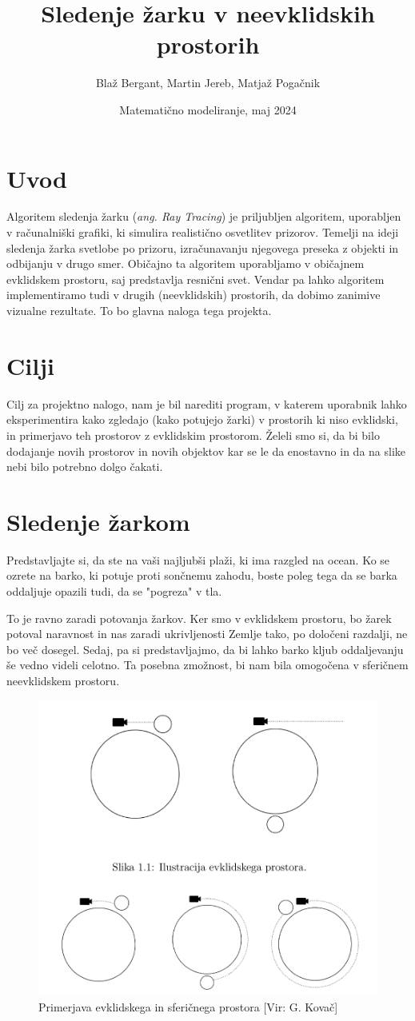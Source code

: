 \documentclass[titlepage]{article}
\title{Sledenje žarku v neevklidskih prostorih}
\author{Blaž Bergant, Martin Jereb, Matjaž Pogačnik}
\date{Matematično modeliranje, maj 2024}
\begin{document}
\maketitle
\newpage
\tableofcontents
\newpage

\section{Uvod}
Algoritem sledenja žarku (\textit{ang. Ray Tracing}) je priljubljen algoritem, uporabljen v 
računalniški grafiki, ki simulira realistično osvetlitev prizorov. Temelji na ideji sledenja 
žarka svetlobe po prizoru, izračunavanju njegovega preseka z objekti in odbijanju v drugo smer. 
Običajno ta algoritem uporabljamo v običajnem evklidskem prostoru, saj predstavlja resnični svet. 
Vendar pa lahko algoritem implementiramo tudi v drugih (neevklidskih) prostorih, da dobimo 
zanimive vizualne rezultate. To bo glavna naloga tega projekta.

\section{Cilji}
Cilj za projektno nalogo, nam je bil narediti program, v katerem uporabnik lahko eksperimentira 
kako zgledajo (kako potujejo žarki) v prostorih ki niso evklidski, in primerjavo teh prostorov z 
evklidskim prostorom. Želeli smo si, da bi bilo dodajanje novih prostorov in novih objektov kar 
se le da enostavno in da na slike nebi bilo potrebno dolgo čakati.
\section{Sledenje žarkom}
Predstavljajte si, da ste na vaši najljubši plaži, ki ima razgled na ocean. Ko se ozrete na barko,
ki potuje proti sončnemu zahodu, boste poleg tega da se barka oddaljuje opazili tudi, da se "pogreza" 
v tla.

To je ravno zaradi potovanja žarkov. Ker smo v evklidskem prostoru, bo žarek potoval naravnost in nas 
zaradi ukrivljenosti Zemlje tako, po določeni razdalji, ne bo več dosegel. Sedaj, pa si predstavljajmo, 
da bi lahko barko kljub oddaljevanju še vedno videli celotno. Ta posebna zmožnost, bi nam bila 
omogočena v sferičnem neevklidskem prostoru.

\begin{figure}[H]
    \centering
    \includegraphics[width=0.5\linewidth]{Images/potovanje_zarkov.png}
    \caption{Primerjava evklidskega in sferičnega prostora [Vir: G. Kovač]}
    \label{Slika:Primerjava evklidskega in sferičnega prostora}
\end{figure}
\end{document}
